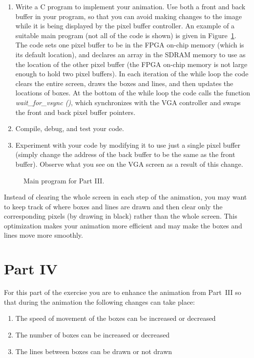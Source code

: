 \documentclass[epsfig,10pt,fullpage]{article}
\begin{document}
\begin{enumerate}

\item Write a C program to implement your animation. Use both a front and back buffer 
in your program, so that you can avoid making changes to the image while it is being displayed 
by the pixel buffer controller.  An example of a suitable main program (not all of the
code is shown) is given in Figure~\ref{fig:main3}. The code sets one pixel buffer to be 
in the FPGA on-chip memory (which is its default location), and
declares an array in the SDRAM memory to use as the location of the other pixel buffer
(the FPGA on-chip memory is not large enough to hold two pixel buffers). 
In each iteration of
the while loop the code clears the entire screen, draws the boxes and lines, and then 
updates the locations of boxes. At the bottom of the while loop the code calls the
function {\it wait\_for\_vsync ()}, which synchronizes with the VGA controller and swaps the 
front and back pixel buffer pointers.

\item Compile, debug, and test your code.

\item Experiment with your code by modifying it to use just a single pixel buffer (simply
change the address of the back buffer to be the same as the front buffer). Observe what you 
see on the VGA screen as a result of this change.
\end{enumerate}

\begin{figure}[H]
\centering

\caption{Main program for Part III.}
\label{fig:main3}
\end{figure}

Instead of clearing the whole screen in each step of the animation, you may want to keep
track of where boxes and lines are drawn and then clear only the corresponding pixels (by
drawing in black) rather than the whole screen. This optimization makes your animation
more efficient and may make the boxes and lines move more smoothly.
\newpage
\section*{Part IV}
For this part of the exercise you are to enhance the animation from Part~III so that
during the animation the following changes can take place:

\begin{enumerate}
\item
The speed of movement of the boxes can be increased or decreased
\item
The number of boxes can be increased or decreased
\item
The lines between boxes can be drawn or not drawn
\end{enumerate}
\end{document}
